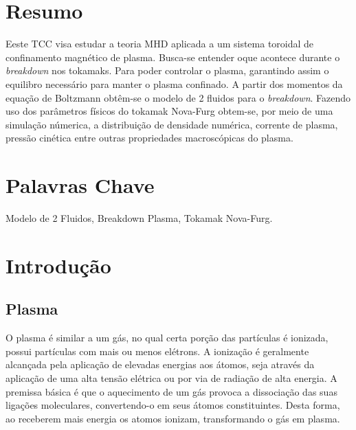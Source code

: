 \documentclass[12pt,oneside,a4paper]{abntex2}
\begin{document}
\imprimircapa

\imprimirfolhaderosto*

\cleardoublepage
\listoffigures*
\listoftables*

\tableofcontents*
\newpage
\mainmatter
\begingroup
\let\clearpage\relax
\setlength\afterchapskip{\lineskip}
\chapter{Resumo}
Eeste TCC visa estudar a teoria MHD aplicada a um sistema toroidal de confinamento magnético de plasma. Busca-se entender oque acontece durante o \textit{breakdown} nos tokamaks. Para poder controlar o plasma, garantindo assim o equilibro necessário para manter o plasma confinado. A partir dos momentos da equação de Boltzmann obtêm-se o modelo de 2 fluidos para o \textit{breakdown}. Fazendo uso dos parâmetros físicos do tokamak Nova-Furg obtem-se, por meio de uma simulação númerica, a distribuição de densidade numérica, corrente de plasma, pressão cinética entre outras propriedades macroscópicas do plasma.

\chapter{Palavras Chave}
Modelo de 2 Fluidos, Breakdown Plasma, Tokamak Nova-Furg.

\chapter{Introdução} 

\section{Plasma}

O plasma é similar a um gás, no qual certa porção das partículas é ionizada, possui partículas com mais ou menos elétrons. A ionização é geralmente alcançada pela aplicação de elevadas energias aos átomos, seja através da aplicação de uma alta tensão elétrica ou por via de radiação de alta energia.
A premissa básica é que o aquecimento de um gás provoca a dissociação das suas ligações moleculares, convertendo-o em seus átomos constituintes. Desta forma, ao receberem mais energia os atomos ionizam, transformando o gás em plasma. \cite{tokamaks}
\end{document}
